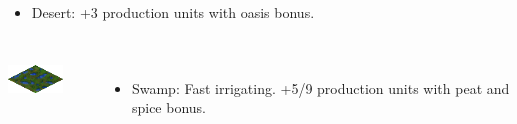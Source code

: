 \begin{frame}
\begin{columns}
		\begin{itemize}
			\item Desert: +3 production units with oasis bonus.
		\end{itemize}
	\end{columns}
	
	\vspace{1em}
	
	\begin{columns}
		\centering \includegraphics[width=0.7\textwidth]{images/swamp.png}
		
		\begin{itemize}
			\item Swamp: Fast irrigating. +5/9 production units with peat and spice bonus.
		\end{itemize}
	\end{columns}
\end{frame}

